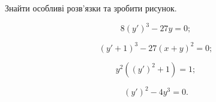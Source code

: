 Знайти особливі розв'язки та зробити рисунок.
\begin{multicols}{2}
	\begin{problem}
		\[8(y')^3-27y=0;\]
	\end{problem}
	
	\begin{problem}
		\[(y'+1)^3-27(x+y)^2=0;\]
	\end{problem}

	\begin{problem}
		\[y^2((y')^2+1)=1;\]
	\end{problem}

	\begin{problem}
		\[(y')^2-4y^3=0.\]
	\end{problem}
\end{multicols}